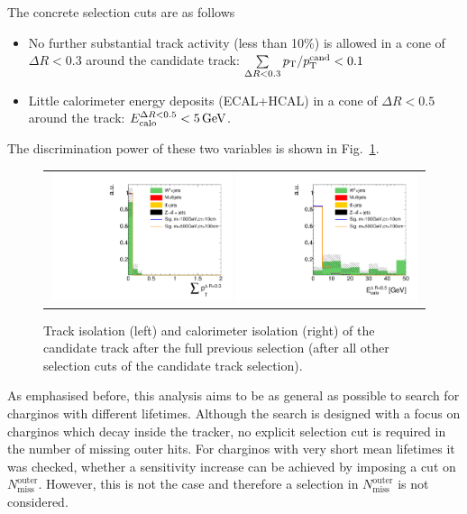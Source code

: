 The concrete selection cuts are as follows
\begin{itemize}
\renewcommand{\labelitemi}{\footnotesize{\ding{118}}}
\item No further substantial track activity (less than 10\%) is allowed in a cone of $\Delta R < 0.3$ around the candidate track: \mbox{$\sum \limits_{\Delta R < 0.3} p_{\text{T}}/p_{\text{T}}^{\text{cand}} < 0.1$}
\item Little calorimeter energy deposits (ECAL+HCAL) in a cone of $\Delta R < 0.5$ around the track: \mbox{$E^{\Delta R<0.5}_{\text{calo}}<5\,\text{Ge}\kern-0.06667em\text{V}$}.
\end{itemize}
The discrimination power of these two variables is shown in Fig.~\ref{fig:TrackIso_Ecalo_After_Preselection}.\\
\begin{figure}[!t]
  \centering 
  \begin{tabular}{c}
    \includegraphics[width=0.49\textwidth]{figures/analysis/AnalysisSelection/chiTracksCandidateSelectionTrigger_2Signals_FullBkg/htrackIsolation_lin.pdf}
    \includegraphics[width=0.49\textwidth]{figures/analysis/AnalysisSelection/chiTracksCandidateSelectionTrigger_2Signals_FullBkg/htrackCaloIsolation_lin.pdf}
  \end{tabular}
  \caption{Track isolation (left) and calorimeter isolation (right) of the candidate track after the full previous selection (after all other selection cuts of the candidate track selection).}
  \label{fig:TrackIso_Ecalo_After_Preselection}
\end{figure}

As emphasised before, this analysis aims to be as general as possible to search for charginos with different lifetimes.
Although the search is designed with a focus on charginos which decay inside the tracker, no explicit selection cut is required in the number of missing outer hits.
For charginos with very short mean lifetimes it was checked, whether a sensitivity increase can be achieved by imposing a cut on $N_{\text{miss}}^{\text{outer}}$.
However, this is not the case and therefore a selection in $N_{\text{miss}}^{\text{outer}}$ is not considered.


